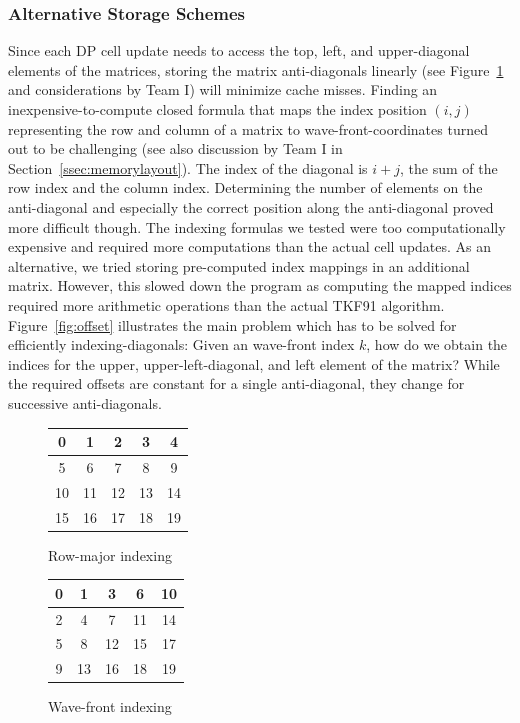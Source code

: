 \documentclass[runningheads,a4paper]{llncs}
\begin{document}
\subsubsection{Alternative Storage Schemes}
\label{par:otherattempts}

Since each DP cell update needs to access the top, left, and upper-diagonal elements of the matrices, 
storing the matrix anti-diagonals linearly (see Figure~\ref{fig:wavefront} and considerations by Team I) 
will minimize cache misses. 
Finding an inexpensive-to-compute closed formula that maps the index position $(i,j)$ representing the row and column of a matrix 
to wave-front-coordinates turned out to be challenging (see also discussion by Team I in Section~\ref{ssec:memorylayout}). 
The index of the diagonal is $i+j$, the sum of the row index and the column index. 
Determining the number of elements on the anti-diagonal and especially the correct position along the anti-diagonal proved more difficult though. 
The indexing formulas we tested were too computationally expensive and required more computations than the actual cell updates.
As an alternative, we tried storing pre-computed index mappings in an additional matrix. 
However, this slowed down the program as computing the mapped indices required more arithmetic operations than the actual TKF91 algorithm.
Figure~\ref{fig:offset} illustrates the main problem which has to be solved 
for efficiently indexing-diagonals: Given an wave-front index $k$, how do we obtain the indices for the upper, upper-left-diagonal, and left element of the matrix? 
While the required offsets are constant for a single anti-diagonal, they change for successive anti-diagonals.

\begin{figure}

\begin{minipage}{0.5\textwidth}
\centering
\begin{tabular}{|c|c|c|c|c|}
\hline 
0 & 1 & 2 & 3 & 4 \\ 
\hline 
5 & 6 & 7 & 8 & 9 \\ 
\hline 
10 & 11 & 12 & 13 & 14 \\ 
\hline 
15 & 16 & 17 & 18 & 19 \\ 
\hline
\end{tabular}
\caption{Row-major indexing}
\label{fig:rowmajor}
\end{minipage}
\begin{minipage}{0.5\textwidth}
\centering
\begin{tabular}{|c|c|c|c|c|}
\hline 
0 & 1 & 3 & 6 & 10 \\ 
\hline 
2 & 4 & 7 & 11 & 14 \\ 
\hline 
5 & 8 & 12 & 15 & 17 \\ 
\hline 
9 & 13 & 16 & 18 & 19 \\ 
\hline 
\end{tabular}
\caption{Wave-front indexing}
\label{fig:wavefront}
\end{minipage}
\end{figure}
\end{document}
